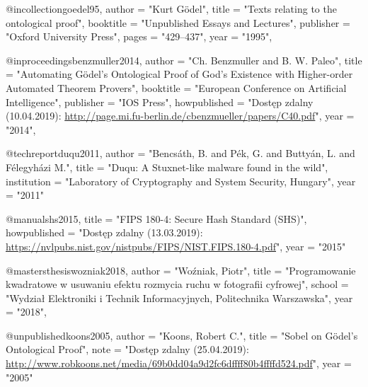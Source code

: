 @incollection{goedel95,
    author      = "Kurt G{\"o}del",
    title       = "Texts relating to the ontological proof",
    booktitle   = "Unpublished Essays and Lectures",
    publisher   = "Oxford University Press",
    pages       = "429--437",
    year        = "1995",
}

@inproceedings{benzmuller2014,
    author       = "{Ch}. Benzmuller and B. W. Paleo",
    title        = "Automating {G\"o}del’s {O}ntological {P}roof of {G}od’s {E}xistence with {H}igher-order {A}utomated {T}heorem {P}rovers",
    booktitle    = "European	Conference on Artificial Intelligence",
    publisher    = "IOS Press",
    howpublished = "Dostęp zdalny (10.04.2019): \url{http://page.mi.fu-berlin.de/cbenzmueller/papers/C40.pdf}",
    year         = "2014",
}

@techreport{duqu2011,
    author      = "Bencsáth, B. and Pék, G. and Buttyán, L. and Félegyházi M.",
    title       = "{D}uqu: {A} {S}tuxnet-like malware found in the wild",
    institution = "Laboratory of Cryptography and System Security, Hungary",
    year        = "2011"
}

@manual{shs2015,
    title        = "{FIPS} 180-4: {S}ecure {H}ash {S}tandard ({SHS})",
    howpublished = "Dostęp zdalny (13.03.2019): \url{https://nvlpubs.nist.gov/nistpubs/FIPS/NIST.FIPS.180-4.pdf}",
    year         = "2015"
}

@mastersthesis{wozniak2018,
    author = "Woźniak, Piotr",
    title  = "{P}rogramowanie kwadratowe w usuwaniu efektu rozmycia ruchu w fotografii cyfrowej",
    school  = "Wydział Elektroniki i Technik Informacyjnych, Politechnika Warszawska",
    year   = "2018",
}

@unpublished{koons2005,
    author = "Koons, Robert C.",
    title  = "{S}obel on {G\"o}del’s {O}ntological {P}roof",
    note   = "Dostęp zdalny (25.04.2019): \url{http://www.robkoons.net/media/69b0dd04a9d2fc6dffff80b4ffffd524.pdf}",
    year   = "2005"
}

